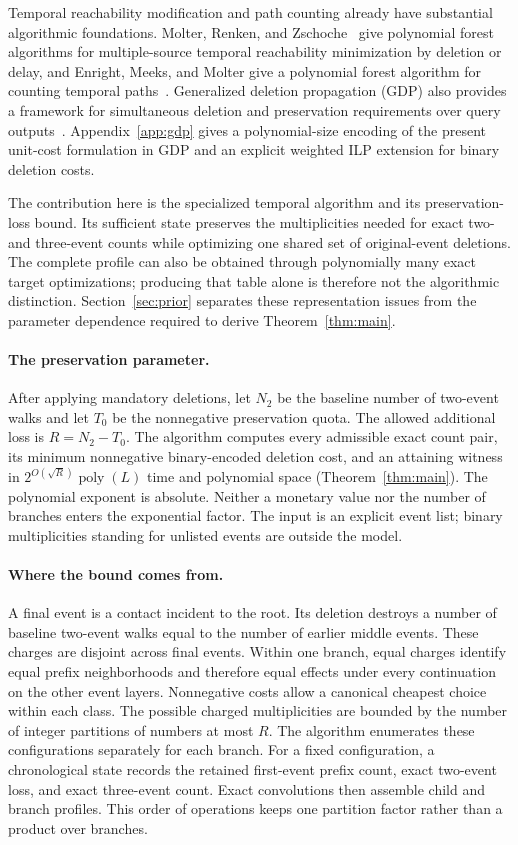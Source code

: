 \documentclass[11pt]{article}
\theoremstyle{remark}
\newcommand{\poly}{\operatorname{poly}}
\begin{document}
Temporal reachability modification and path counting already have substantial
algorithmic foundations. Molter, Renken, and
Zschoche~\citep[Theorems 14--15]{molter2024} give polynomial forest
algorithms for multiple-source temporal reachability minimization by deletion
or delay, and Enright, Meeks, and Molter give a polynomial forest algorithm
for counting temporal paths~\citep{enright2025counting}.
Generalized deletion propagation (GDP) also provides a framework for
simultaneous deletion and preservation requirements over query
outputs~\citep{makhija2025gdp}. Appendix~\ref{app:gdp} gives a polynomial-size
encoding of the present unit-cost formulation in GDP and an explicit
weighted ILP extension for binary deletion costs.

The contribution here is the specialized temporal algorithm and its
preservation-loss bound. Its sufficient state preserves the multiplicities
needed for exact two- and three-event counts while optimizing one shared
set of original-event deletions. The complete profile can also be obtained
through polynomially many exact target optimizations; producing that table
alone is therefore not the algorithmic distinction. Section~\ref{sec:prior}
separates these representation issues from the parameter dependence required
to derive Theorem~\ref{thm:main}.

\paragraph{The preservation parameter.}
After applying mandatory deletions, let $N_2$ be the baseline number of
two-event walks and let $T_0$ be the nonnegative preservation quota. The allowed
additional loss is $R=N_2-T_0$. The algorithm computes every admissible exact
count pair, its minimum nonnegative binary-encoded deletion cost, and an
attaining witness in $2^{O(\sqrt R)}\poly(L)$ time and polynomial space
(Theorem~\ref{thm:main}). The polynomial exponent is absolute. Neither a
monetary value nor the number of branches enters the exponential factor.
The input is an explicit event list; binary multiplicities standing for
unlisted events are outside the model.

\paragraph{Where the bound comes from.}
A final event is a contact incident to the root. Its deletion destroys a
number of baseline two-event walks equal to the number of earlier middle
events. These charges are disjoint across final events. Within one branch,
equal charges identify equal prefix neighborhoods and therefore equal effects
under every continuation on the other event layers. Nonnegative costs allow a
canonical cheapest choice within each class. The possible charged
multiplicities are bounded by the number of integer partitions of numbers at
most $R$. The algorithm enumerates these configurations separately for each branch.
For a fixed configuration, a chronological state records the retained
first-event prefix count, exact two-event loss, and exact three-event count.
Exact convolutions then assemble child and branch profiles. This order of
operations keeps one partition factor rather than a product over branches.
\end{document}
